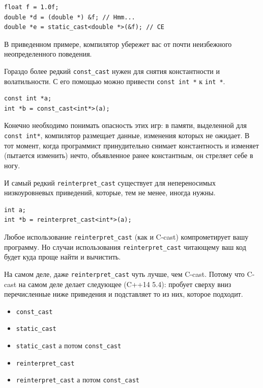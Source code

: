 \documentclass[a4paper,12pt,oneside]{article}
\begin{document}
\begin{lstlisting}
float f = 1.0f;
double *d = (double *) &f; // Hmm...
double *e = static_cast<double *>(&f); // CE
\end{lstlisting}

В приведенном примере, компилятор убережет вас от почти неизбежного неопределенного поведения.

Гораздо более редкий \lstinline!const_cast! нужен для снятия константности и волатильности. С его помощью можно привести \lstinline!const int *! к \lstinline!int *!. 

\begin{lstlisting}
const int *a;
int *b = const_cast<int*>(a);
\end{lstlisting}

Конечно необходимо понимать опасность этих игр: в памяти, выделенной для \lstinline!const int*!, компилятор размещает данные, изменения которых не ожидает. В тот момент, когда программист принудительно снимает константность и изменяет (пытается изменить) нечто, объявленное ранее константным, он стреляет себе в ногу.

И самый редкий \lstinline!reinterpret_cast! существует для непереносимых низкоуровневых приведений, которые, тем не менее, иногда нужны.

\begin{lstlisting}
int a;
int *b = reinterpret_cast<int*>(a);
\end{lstlisting}

Любое использование \lstinline!reinterpret_cast! (как и C-cast) компрометирует вашу программу. Но случаи использования \lstinline!reinterpret_cast! читающему ваш код будет куда проще найти и вычистить.

На самом деле, даже \lstinline!reinterpret_cast! чуть лучше, чем C-cast. Потому что C-cast на самом деле делает следующее (C++14 5.4): пробует сверху вниз перечисленные ниже приведения и подставляет то из них, которое подходит.

\begin{itemize}
\item \lstinline!const_cast!
\item \lstinline!static_cast!
\item \lstinline!static_cast! а потом \lstinline!const_cast!
\item \lstinline!reinterpret_cast!
\item \lstinline!reinterpret_cast! а потом \lstinline!const_cast!
\end{itemize}
\end{document}
